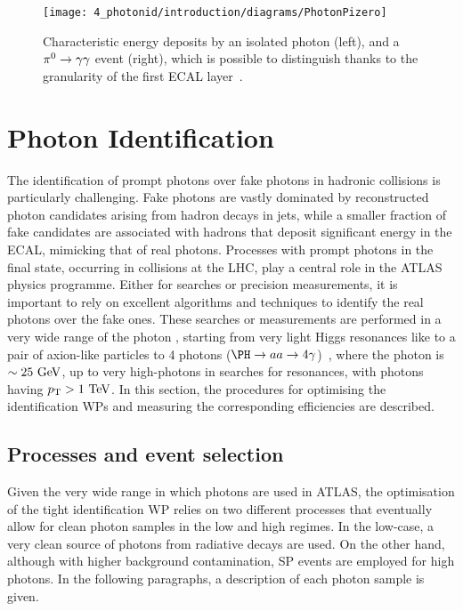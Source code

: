 \begin{figure}[ht!]
    \centering
    \texttt{[image: 4\_photonid/introduction/diagrams/PhotonPizero]}
    \caption{Characteristic energy deposits by an isolated photon (left), and a \(\pi^{0}\rightarrow\gamma\gamma\) event (right), which is possible to distinguish thanks to the granularity of the first \ac{ECAL} layer~\cite{ATLAS-ECAL-Pizero}.}
    \label{fig:pid_ss:ss:pizero}
\end{figure}






\section{Photon Identification}
\label{sec:pid_ss:pid}

The identification of prompt photons over fake photons in hadronic collisions is particularly challenging. Fake photons are vastly dominated by reconstructed photon candidates arising from hadron decays in jets, while a smaller fraction of fake candidates are associated with hadrons that deposit significant energy in the \ac{ECAL}, mimicking that of real photons.
Processes with prompt photons in the final state, occurring in \pp collisions at the \ac{LHC}, play a central role in the \ac{ATLAS} physics programme. Either for searches or precision measurements, it is important to rely on excellent algorithms and techniques to identify the real photons over the fake ones. These searches or measurements are performed in a very wide range of the photon \pt, starting from very light Higgs resonances like to a pair of axion-like particles to 4 photons (\(\PH\to aa \to 4\gamma\))~\cite{ATLAS-HiggsTo4Gamma}, where the photon \pt is \(\sim 25~\text{GeV}\), up to very high-\pt photons in searches for \gammajet resonances, with photons having \(p_{\text{T}}>1~\text{TeV}\). In this section, the procedures for optimising the identification \acp{WP} and measuring the corresponding efficiencies are described.



\subsection{Processes and event selection}
\label{subsec:pid_ss:pid:event_selection}

Given the very wide range in which photons are used in \ac{ATLAS}, the optimisation of the tight identification \ac{WP} relies on two different processes that eventually allow for clean photon samples in the low and high \pt regimes. In the low-\pt case, a very clean source of photons from radiative \Zboson decays are used. On the other hand, although with higher background contamination, \acf{SP} events are employed for high \pt photons. In the following paragraphs, a description of each photon sample is given.


